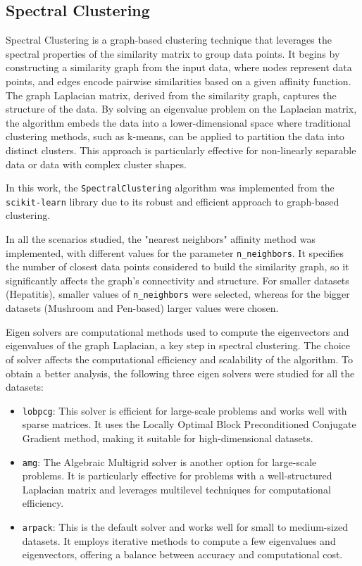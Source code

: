 \subsection{Spectral Clustering}
Spectral Clustering is a graph-based clustering technique that leverages the spectral properties of the similarity matrix
 to group data points. It begins by constructing a similarity graph from the input data, where nodes represent data points,
 and edges encode pairwise similarities based on a given affinity function. The graph Laplacian matrix, derived from the
 similarity graph, captures the structure of the data. By solving an eigenvalue problem on the Laplacian matrix, the
 algorithm embeds the data into a lower-dimensional space where traditional clustering methods, such as k-means, can
 be applied to partition the data into distinct clusters. This approach is particularly effective for non-linearly
 separable data or data with complex cluster shapes.


In this work, the \texttt{SpectralClustering} algorithm was implemented from the \texttt{scikit-learn} library due
to its robust and efficient approach to graph-based clustering.

In all the scenarios studied, the "nearest neighbors" affinity method was implemented, with different values for the
parameter \texttt{n\_neighbors}. It specifies the number of closest data points considered to build the similarity graph,
so it significantly affects the graph's connectivity and structure. For smaller datasets (Hepatitis), smaller values of
 \texttt{n\_neighbors} were selected, whereas for the bigger datasets (Mushroom and Pen-based) larger values were chosen.

Eigen solvers are computational methods used to compute the eigenvectors and eigenvalues of the graph Laplacian,
a key step in spectral clustering. The choice of solver affects the computational efficiency and scalability of the algorithm.
To obtain a better analysis, the following three eigen solvers were studied for all the datasets:

  \begin{itemize}
    \item \texttt{lobpcg}: This solver is efficient for large-scale problems and works well with sparse matrices. It uses the Locally Optimal Block Preconditioned Conjugate Gradient method, making it suitable for high-dimensional datasets.
    \item \texttt{amg}: The Algebraic Multigrid solver is another option for large-scale problems. It is particularly effective for problems with a well-structured Laplacian matrix and leverages multilevel techniques for computational efficiency.
    \item \texttt{arpack}: This is the default solver and works well for small to medium-sized datasets. It employs iterative methods to compute a few eigenvalues and eigenvectors, offering a balance between accuracy and computational cost.
\end{itemize}

